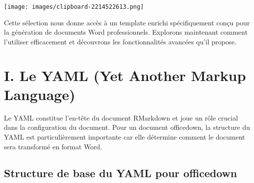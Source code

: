 \documentclass[
]{article}
\begin{document}
\texttt{[image: images/clipboard-2214522613.png]}

Cette sélection nous donne accès à un template enrichi spécifiquement
conçu pour la génération de documents Word professionnels. Explorons
maintenant comment l'utiliser efficacement et découvrons les
fonctionnalités avancées qu'il propose.

\section{I. Le YAML (Yet Another Markup
Language)}\label{i.-le-yaml-yet-another-markup-language}

Le YAML constitue l'en-tête du document RMarkdown et joue un rôle
crucial dans la configuration du document. Pour un document officedown,
la structure du YAML est particulièrement importante car elle détermine
comment le document sera transformé en format Word.

\subsection{Structure de base du YAML pour
officedown}\label{structure-de-base-du-yaml-pour-officedown}
\end{document}
